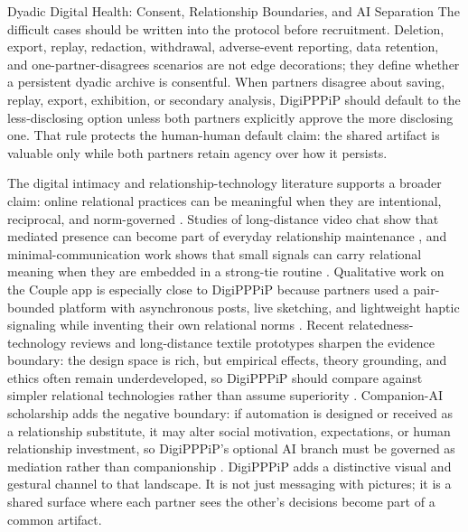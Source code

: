 \documentclass[
  ignorenonframetext,
]{beamer}
\begin{document}
\begin{frame}[allowframebreaks]{Dyadic Digital Health: Consent,
Relationship Boundaries, and AI Separation}
The difficult cases should be written into the protocol before
recruitment. Deletion, export, replay, redaction, withdrawal,
adverse-event reporting, data retention, and one-partner-disagrees
scenarios are not edge decorations; they define whether a persistent
dyadic archive is consentful. When partners disagree about saving,
replay, export, exhibition, or secondary analysis, DigiPPPiP should
default to the less-disclosing option unless both partners explicitly
approve the more disclosing one. That rule protects the human-human
default claim: the shared artifact is valuable only while both partners
retain agency over how it persists.

The digital intimacy and relationship-technology literature supports a
broader claim: online relational practices can be meaningful when they
are intentional, reciprocal, and norm-governed
. Studies of long-distance video chat show that
mediated presence can become part of everyday relationship maintenance
, and minimal-communication work shows
that small signals can carry relational meaning when they are embedded
in a strong-tie routine . Qualitative work on the
Couple app is especially close to DigiPPPiP because partners used a
pair-bounded platform with asynchronous posts, live sketching, and
lightweight haptic signaling while inventing their own relational norms
. Recent relatedness-technology reviews
and long-distance textile prototypes sharpen the evidence boundary: the
design space is rich, but empirical effects, theory grounding, and
ethics often remain underdeveloped, so DigiPPPiP should compare against
simpler relational technologies rather than assume superiority
. Companion-AI
scholarship adds the negative boundary: if automation is designed or
received as a relationship substitute, it may alter social motivation,
expectations, or human relationship investment, so DigiPPPiP's optional
AI branch must be governed as mediation rather than companionship
. DigiPPPiP adds a distinctive visual and
gestural channel to that landscape. It is not just messaging with
pictures; it is a shared surface where each partner sees the other's
decisions become part of a common artifact.
\end{frame}
\end{document}
